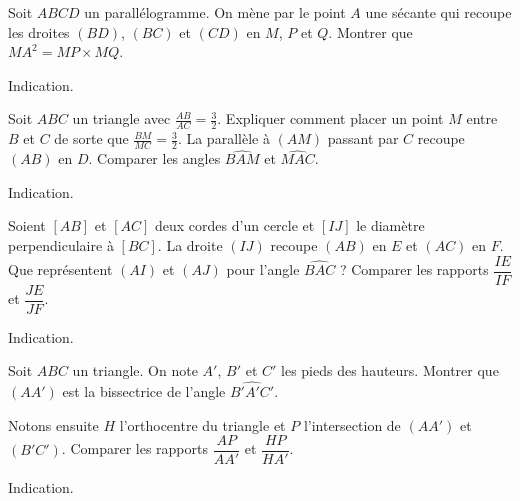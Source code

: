 \begin{exo}
Soit $ABCD$ un parallélogramme.
On mène par le point $A$ une sécante qui recoupe les droites $(BD)$, $(BC)$ et $(CD)$ en $M$, $P$ et $Q$.
Montrer que $MA^2=MP\times MQ$.
\begin{hint}
Indication.
\end{hint}
\begin{sol}
\end{sol}
\end{exo}



\begin{exo}
Soit $ABC$ un triangle avec $\frac{AB}{AC} = \frac{3}{2}$.
Expliquer comment placer un point $M$ entre $B$ et $C$ de sorte que $\frac{BM}{MC}=\frac{3}{2}$.
La parallèle à $(AM)$ passant par $C$ recoupe $(AB)$ en $D$.
Comparer les angles $\widehat{BAM}$ et $\widehat{MAC}$.
\begin{hint}
Indication.
\end{hint}
\begin{sol}
\end{sol}
\end{exo}



\begin{exo}
Soient $[AB]$ et $[AC]$ deux cordes d'un cercle et $[IJ]$ le diamètre perpendiculaire à $[BC]$.
La droite $(IJ)$ recoupe $(AB)$ en $E$ et $(AC)$ en $F$.
Que représentent $(AI)$ et $(AJ)$ pour l'angle $\widehat{BAC}$ ?
Comparer les rapports $\dfrac{IE}{IF}$ et $\dfrac{JE}{JF}$. 
\begin{hint}
Indication.
\end{hint}
\begin{sol}
\end{sol}
\end{exo}




\begin{exo}
Soit $ABC$ un triangle.
On note $A'$, $B'$ et $C'$ les pieds des hauteurs.
Montrer que $(AA')$ est la bissectrice de l'angle $\widehat{B'A'C'}$. %


Notons ensuite  $H$ l'orthocentre du triangle et $P$ l'intersection de $(AA')$ et $(B'C')$. 
Comparer les rapports $\dfrac{AP}{AA'}$ et $\dfrac{HP}{HA'}$.
\begin{hint}
Indication.
\end{hint}
\begin{sol}
\end{sol}
\end{exo}



